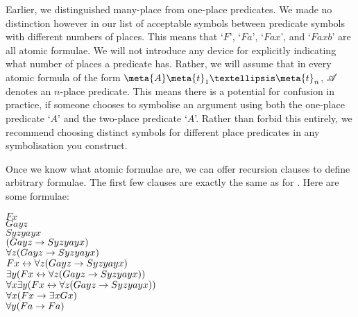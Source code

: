 Earlier, we distinguished many-place from one-place predicates. We made no distinction however in our list of acceptable symbols between predicate symbols with different numbers of places. This means that `$F$', `$Fa$', `$Fax$', and `$Faxb$' are all atomic formulae. We will not introduce any device for explicitly indicating what number of places a predicate has. Rather, we will assume that in every atomic formula of the form $\meta{A}\meta{t}_{1}…\meta{t}_{n}$, $\mathscr{A}$ denotes an $n$-place predicate. This means there is a potential for confusion in practice, if someone chooses to symbolise an argument using both the one-place predicate `$A$' and the two-place predicate `$A$'. Rather than forbid this entirely, we recommend choosing distinct symbols for different place predicates in any symbolisation you construct.

Once we know what atomic formulae are, we can offer recursion clauses to define arbitrary formulae. The first few clauses are exactly the same as for \TFL.
Here are some formulae:
	\begin{center}
		$Fx$\\
		$Gayz$\\
		$Syzyayx$\\
		$(Gayz \rightarrow Syzyayx)$\\
		$\forall z (Gayz \rightarrow Syzyayx)$\\
		$Fx \leftrightarrow \forall z (Gayz \rightarrow Syzyayx)$\\
		$\exists y (Fx \leftrightarrow \forall z (Gayz \rightarrow Syzyayx))$\\
		$\forall x \exists y (Fx \leftrightarrow \forall z (Gayz \rightarrow Syzyayx))$\\
		$\forall x (Fx \rightarrow \exists x Gx)$\\
		$\forall y (Fa \rightarrow Fa) $\end{center}


